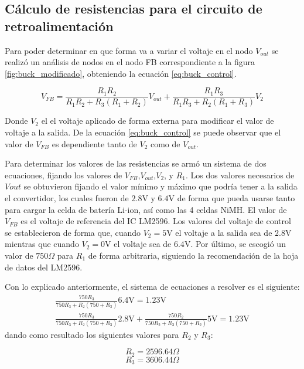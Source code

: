 \subsection{Cálculo de resistencias para el circuito de retroalimentación}

\label{sec:res_ret}

Para poder determinar en que forma va a variar el voltaje en el nodo $V_{out}$ se realizó un 
análisis de nodos en el nodo FB correspondiente a la figura \ref*{fig:buck_modificado}, 
obteniendo la ecuación \ref*{eq:buck_control}.

\begin{equation}
    V_{FB} = \frac{R_1R_2}{R_1R_2+R_3(R_1+R_2)} V_{out} + \frac{R_1R_3}{R_1R_3+R_2(R_1+R_3)} V_2
    \label{eq:buck_control}
\end{equation}

Donde $V_2$ el el voltaje aplicado de forma externa para modificar el valor
de voltaje a la salida. De la ecuación \ref*{eq:buck_control} se puede 
observar que el valor de $V_{FB}$ es dependiente tanto de $V_2$ como de
$V_{out}$. 

Para determinar los valores de las resistencias se armó un sistema de dos ecuaciones,
fijando los valores de $V_{FB}$,$V_{out}$,$V_2$, y $R_1$. Los dos valores necesarios
de $V{out}$ se obtuvieron fijando el valor mínimo y máximo que podría tener a la salida
el convertidor, los cuales fueron de $2.8\text{V}$ y $6.4\text{V}$ de forma que pueda usarse tanto para 
cargar la celda de batería Li-ion, así como las 4 celdas NiMH. El valor de $V_{FB}$ 
es el voltaje de referencia del IC LM2596. Los valores del voltaje de control se
establecieron de forma que, cuando $V_2 = 5\text{V}$ el voltaje a la salida sea de 
$2.8\text{V}$ mientras que cuando  $V_2 = 0\text{V}$ el voltaje sea de $6.4\text{V}$.
Por último, se escogió un valor de $750\Omega$ para $R_1$ de forma arbitraria, siguiendo
la recomendación de la hoja de datos del LM2596.

Con lo explicado anteriormente, el sistema de ecuaciones a resolver es el siguiente:
\begin{eqnarray}
     \frac{750R_3}{ 750R_3 + R_2(750 + R_3)} 6.4\text{V} = 1.23\text{V} \\
    \frac{750R_3}{ 750R_3 + R_2(750 + R_3)} 2.8\text{V} + \frac{750R_2}{750R_2+R_3(750+R_2)} 5\text{V} = 1.23\text{V}   
\end{eqnarray}
dando como resultado los siguientes valores para $R_2$ y $R_3$:

$$R_2 = 2596.64\Omega$$ 
$$R_3 = 3606.44\Omega$$

